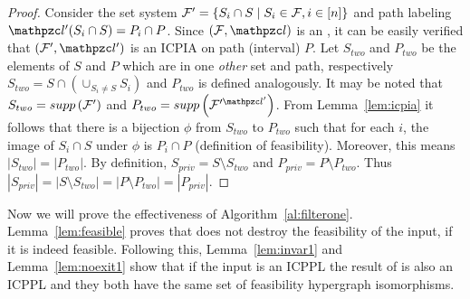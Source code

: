 \begin{proof}
  Consider the set system $ {\cal F}' = \{S_i \cap S \mid S_i \in {\cal F}, i
  \in [n]\}$ and path labeling $\cl'(S_i \cap S) = P_i \cap P$.  Since
  $(\cF, \cl)$ is an \ICPPL, it can be easily verified that $(\cF',
  \cl')$ is an ICPIA on path (interval) $P$.  Let $S_{two}$ and
  $P_{two}$ be the elements of $S$ and $P$ which are in one {\em
    other} set and path, respectively \ie $S_{two} = S \cap (\cup_{S_i
    \ne S} S_i)$ and $P_{two}$ is defined analogously. It may be noted
  that $S_{two} = supp\left({\cal F}'\right)$ and $P_{two} = \supt{\cF'^{\cl'}}$.
  From Lemma~\ref{lem:icpia} it follows that there is a bijection
  $\phi$ from $S_{two}$ to $P_{two}$ such that for each $i$, the image
  of $S_i \cap S$ under $\phi$ is $P_i \cap P$ (definition of
  feasibility).  Moreover, this means $|S_{two}| = |P_{two}|$. By
  definition, $S_{priv} = S \setminus S_{two}$ and $P_{priv} = P \setminus P_{two}$.
  Thus $|S_{priv}| = |S \setminus S_{two}| = |P \setminus
  P_{two}|=|P_{priv}|$.  
\end{proof}


Now we will prove the effectiveness of Algorithm~\ref{al:filterone}.
Lemma~\ref{lem:feasible} proves that \filteri does not destroy
the feasibility of the input, if it is indeed feasible. Following
this, Lemma~\ref{lem:invar1} and Lemma~\ref{lem:noexit1} show that if
the input is an ICPPL the result of \filteri is also an ICPPL
and they both have the same set of feasibility hypergraph
isomorphisms.

